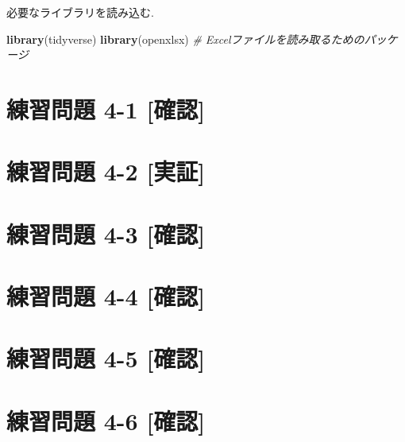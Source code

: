 \documentclass[
]{book}
\newenvironment{Shaded}{\begin{snugshade}}{\end{snugshade}}
\newcommand{\CommentTok}[1]{\textcolor[rgb]{0.56,0.35,0.01}{\textit{#1}}}
\newcommand{\FunctionTok}[1]{\textcolor[rgb]{0.13,0.29,0.53}{\textbf{#1}}}
\newcommand{\NormalTok}[1]{#1}
\begin{document}
必要なライブラリを読み込む.

\begin{Shaded}
\begin{Highlighting}[]
\FunctionTok{library}\NormalTok{(tidyverse)}
\FunctionTok{library}\NormalTok{(openxlsx) }\CommentTok{\# Excelファイルを読み取るためのパッケージ}
\end{Highlighting}
\end{Shaded}

\hypertarget{ux7df4ux7fd2ux554fux984c-4-1-ux78baux8a8d}{%
\section*{練習問題 4-1 {[}確認{]}}\label{ux7df4ux7fd2ux554fux984c-4-1-ux78baux8a8d}}

\hypertarget{ux7df4ux7fd2ux554fux984c-4-2-ux5b9fux8a3c}{%
\section*{練習問題 4-2 {[}実証{]}}\label{ux7df4ux7fd2ux554fux984c-4-2-ux5b9fux8a3c}}

\hypertarget{ux7df4ux7fd2ux554fux984c-4-3-ux78baux8a8d}{%
\section*{練習問題 4-3 {[}確認{]}}\label{ux7df4ux7fd2ux554fux984c-4-3-ux78baux8a8d}}

\hypertarget{ux7df4ux7fd2ux554fux984c-4-4-ux78baux8a8d}{%
\section*{練習問題 4-4 {[}確認{]}}\label{ux7df4ux7fd2ux554fux984c-4-4-ux78baux8a8d}}

\hypertarget{ux7df4ux7fd2ux554fux984c-4-5-ux78baux8a8d}{%
\section*{練習問題 4-5 {[}確認{]}}\label{ux7df4ux7fd2ux554fux984c-4-5-ux78baux8a8d}}

\hypertarget{ux7df4ux7fd2ux554fux984c-4-6-ux78baux8a8d}{%
\section*{練習問題 4-6 {[}確認{]}}\label{ux7df4ux7fd2ux554fux984c-4-6-ux78baux8a8d}}
\end{document}
